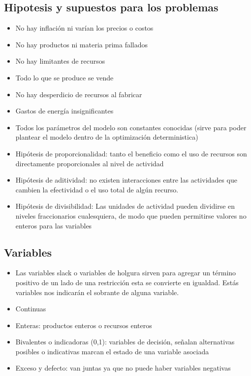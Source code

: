 \documentclass[titlepage,a4paper]{article}
\begin{document}
\vspace{0.5cm}

\subsection{Hipotesis y supuestos para los problemas}

\begin{itemize}
    \item No hay inflación ni varían los precios o costos
    \item No hay productos ni materia prima fallados
    \item No hay limitantes de recursos
    \item Todo lo que se produce se vende
    \item No hay desperdicio de recursos al fabricar
    \item Gastos de energía insignificantes
    \item Todos los parámetros del modelo son constantes conocidas (sirve para poder plantear el modelo dentro de la optimización deterministica)
    \item Hipótesis de proporcionalidad: tanto el beneficio como el uso de recursos son directamente proporcionales al nivel de actividad
    \item Hipótesis de aditividad: no existen interacciones entre las actividades que cambien la efectividad o el uso total de algún recurso.
    \item Hipótesis de divisibilidad: Las unidades de actividad pueden dividirse en niveles fraccionarios cualesquiera, de modo que pueden permitirse valores no enteros para las variables
\end{itemize}

\vspace{0.5cm}


\subsection{Variables}

\begin{itemize}
    \item Las variables slack o variables de holgura sirven para agregar un término positivo de un lado de una restricción esta se convierte en igualdad. Estás variables nos indicarán el sobrante de alguna variable.
    \item Continuas
    \item Enteras: productos enteros o recursos enteros
    \item Bivalentes o indicadoras (0,1): variables de decisión, señalan alternativas posibles o indicativas marcan el estado de una variable asociada
    \item Exceso y defecto: van juntas ya que no puede haber variables negativas 
\end{itemize}
\end{document}
